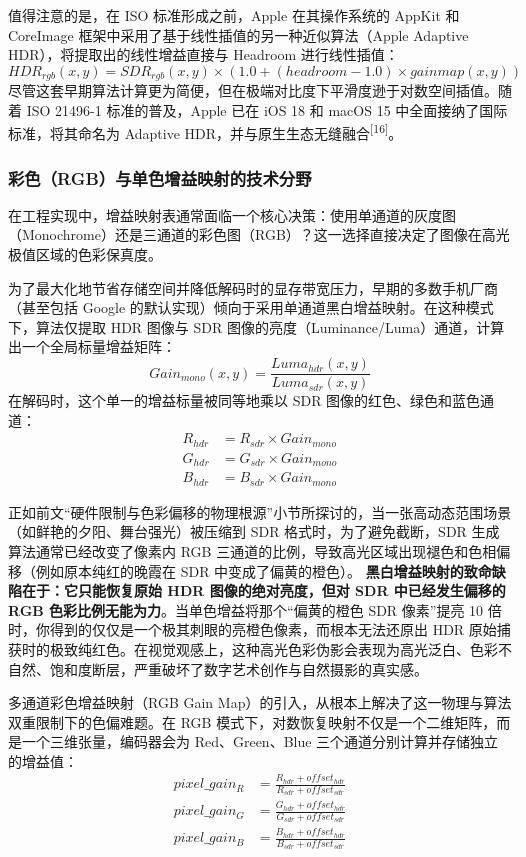 \documentclass[12pt, a4paper]{ctexart}
\newcommand{\scite}[1]{\textsuperscript{[#1]}}
\begin{document}
值得注意的是，在 ISO 标准形成之前，Apple 在其操作系统的 AppKit 和 CoreImage 框架中采用了基于线性插值的另一种近似算法（Apple Adaptive HDR），将提取出的线性增益直接与 Headroom 进行线性插值：
$$
HDR_{rgb}(x, y) = SDR_{rgb}(x, y) \times \left( 1.0 + (headroom - 1.0) \times gainmap(x, y) \right)
$$
尽管这套早期算法计算更为简便，但在极端对比度下平滑度逊于对数空间插值。随着 ISO 21496-1 标准的普及，Apple 已在 iOS 18 和 macOS 15 中全面接纳了国际标准，将其命名为 Adaptive HDR，并与原生生态无缝融合\scite{16}。

\subsubsection{彩色（RGB）与单色增益映射的技术分野}
    
在工程实现中，增益映射表通常面临一个核心决策：使用单通道的灰度图（Monochrome）还是三通道的彩色图（RGB）？这一选择直接决定了图像在高光极值区域的色彩保真度。

为了最大化地节省存储空间并降低解码时的显存带宽压力，早期的多数手机厂商（甚至包括 Google 的默认实现）倾向于采用单通道黑白增益映射。在这种模式下，算法仅提取 HDR 图像与 SDR 图像的亮度（Luminance/Luma）通道，计算出一个全局标量增益矩阵：
\begin{equation}
Gain_{mono}(x, y) = \frac{Luma_{hdr}(x, y)}{Luma_{sdr}(x, y)}
\end{equation}
在解码时，这个单一的增益标量被同等地乘以 SDR 图像的红色、绿色和蓝色通道：
\begin{align}
R_{hdr} &= R_{sdr} \times Gain_{mono} \nonumber \\
G_{hdr} &= G_{sdr} \times Gain_{mono} \nonumber \\
B_{hdr} &= B_{sdr} \times Gain_{mono}
\end{align}

正如前文“硬件限制与色彩偏移的物理根源”小节所探讨的，当一张高动态范围场景（如鲜艳的夕阳、舞台强光）被压缩到 SDR 格式时，为了避免截断，SDR 生成算法通常已经改变了像素内 RGB 三通道的比例，导致高光区域出现褪色和色相偏移（例如原本纯红的晚霞在 SDR 中变成了偏黄的橙色）。
\textbf{黑白增益映射的致命缺陷在于：它只能恢复原始 HDR 图像的绝对亮度，但对 SDR 中已经发生偏移的 RGB 色彩比例无能为力}。当单色增益将那个“偏黄的橙色 SDR 像素”提亮 10 倍时，你得到的仅仅是一个极其刺眼的亮橙色像素，而根本无法还原出 HDR 原始捕获时的极致纯红色。在视觉观感上，这种高光色彩伪影会表现为高光泛白、色彩不自然、饱和度断层，严重破坏了数字艺术创作与自然摄影的真实感。

多通道彩色增益映射（RGB Gain Map）的引入，从根本上解决了这一物理与算法双重限制下的色偏难题。在 RGB 模式下，对数恢复映射不仅是一个二维矩阵，而是一个三维张量，编码器会为 Red、Green、Blue 三个通道分别计算并存储独立的增益值：
\begin{align}
pixel\_gain_R &= \frac{R_{hdr} + offset_{hdr}}{R_{sdr} + offset_{sdr}} \nonumber \\
pixel\_gain_G &= \frac{G_{hdr} + offset_{hdr}}{G_{sdr} + offset_{sdr}} \nonumber \\
pixel\_gain_B &= \frac{B_{hdr} + offset_{hdr}}{B_{sdr} + offset_{sdr}}
\end{align}
\end{document}

